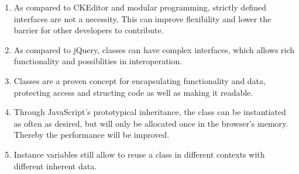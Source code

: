 \begin{enumerate}
\item As compared to CKEditor and modular programming, strictly defined interfaces are not a necessity. This can improve flexibility and lower the barrier for other developers to contribute. %
\item As compared to jQuery, classes can have complex interfaces, which allows rich functionality and possiblities in interoperation.
\item Classes are a proven concept for encapsulating functionality and data, protecting access and structing code as well as making it readable.
\item Through JavaScript's prototypical inheritance, the class can be instantiated as often as desired, but will only be allocated once in the browser's memory. Thereby the performance will be improved.
\item Instance variables still allow to reuse a class in different contexts with different inherent data. %
\end{enumerate}




